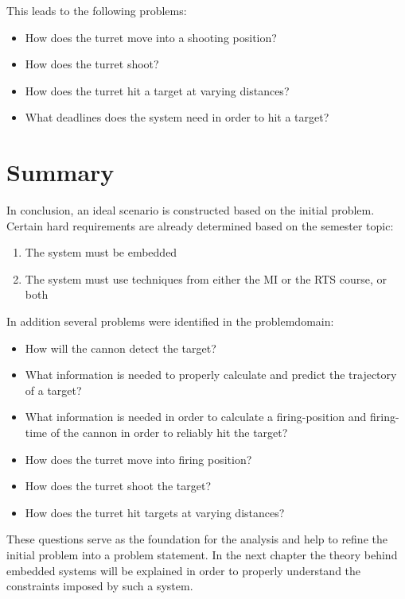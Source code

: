 This leads to the following problems:
\begin{itemize}
  \item How does the turret move into a shooting position?
  \item How does the turret shoot?
  \item How does the turret hit a target at varying distances?
  \item What deadlines does the system need in order to hit a target?
\end{itemize}

\section{Summary}
In conclusion, an ideal scenario is constructed based on the initial problem.
Certain hard requirements are already determined based on the semester
topic:
\begin{enumerate}
	\item The system must be embedded
	\item The system must use techniques from either the MI or the RTS course, or both
\end{enumerate}

In addition several problems were identified in the problemdomain:
\begin{itemize}
	\item How will the cannon detect the target?
	\item What information is needed to properly calculate and predict the
	trajectory of a target?
	\item What information is needed in order to calculate a firing-position and
	firing-time of the cannon in order to reliably hit the target?
	\item How does the turret move into firing position?
	\item How does the turret shoot the target?
	\item How does the turret hit targets at varying distances?
\end{itemize}

These questions serve as the foundation for the analysis and help to
refine the initial problem into a problem statement. In the next chapter the
theory behind embedded systems will be explained in order to properly
understand the constraints imposed by such a system.

